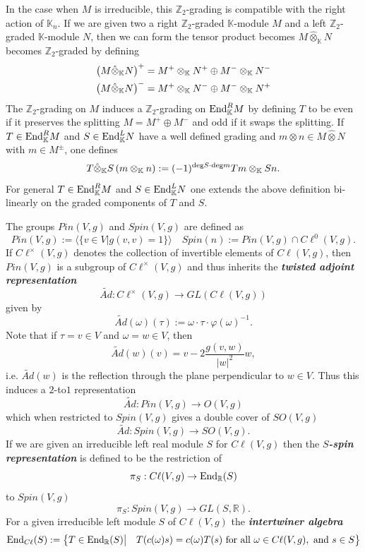 \documentclass[openany, 11pt]{article}
\theoremstyle{definition}
\theoremstyle{remark}
\def\la{\ensuremath{\langle}}
\def\ra{\ensuremath{\rangle}}
\def\lp{\ensuremath{\left(}}
\def\rp{\ensuremath{\right)}}
\def\bR{\ensuremath{\mathbb{R}}}
\def\bZ{\ensuremath{\mathbb{Z}}}
\def\bK{\ensuremath{\mathbb{K}}}
\def\End{\ensuremath{\textnormal{End}}}
\begin{document}
In the case when $M$ is irreducible, this $\bZ_2$-grading is compatible with the right action of $\bK_n$. If we are given two a right $\bZ_2$-graded $\bK$-module $M$ and a left $\bZ_2$-graded $\bK$-module $N$, then we can form the tensor product becomes $M\hat{\otimes}_{\bK}N$ becomes $\bZ_2$-graded by defining
\begin{align*}
    \lp M\hat{\otimes}_{\bK}N\rp^+&=M^+\otimes_{\bK}N^+\oplus M^-\otimes_{\bK}N^-\\
    \lp M\hat{\otimes}_{\bK}N\rp^-&=M^+\otimes_{\bK}N^-\oplus M^-\otimes_{\bK}N^+
\end{align*}
The $\bZ_2$-grading on $M$ induces a $\bZ_2$-grading on $\End^R_{\bK}M$ by defining $T$ to be even if it preserves the splitting $M=M^+\oplus M^-$ and odd if it swaps the splitting. 
If $T\in\End^R_{\bK}M$ and $S\in\End^L_{\bK}N$ have a well defined grading and $m\otimes n\in M\hat{\otimes}N$ with $m\in M^{\pm}$, one defines
\[
    T\hat{\otimes}_{\bK}S\lp m\otimes_{\bK} n\rp:=(-1)^{\text{deg}S\cdot\text{deg}m}Tm\otimes_{\bK} Sn.
\]
For general $T\in\End^R_{\bK}M$ and $S\in\End^L_{\bK}N$ one extends the above definition bi-linearly on the graded components of $T$ and $S$.
\par
The groups $Pin(V,g)$ and $Spin(V,g)$ are defined as
\[
    Pin(V,g):=\la \bigl\{ v\in V\big|g(v,v)=1\bigr\}\ra\quad Spin(n):=Pin(V,g)\cap C\ell^0(V,g).
\]
If $C\ell^{\times}(V,g)$ denotes the collection of invertible elements of $C\ell(V,g)$, then $Pin(V,g)$ is a subgroup of $C\ell^{\times}(V,g)$ and thus inherits the \textbf{\emph{twisted adjoint representation}}
\[
    \widetilde{Ad}:C\ell^{\times}(V,g)\rightarrow GL(C\ell(V,g))
\]
given by
\[
    \widetilde{Ad}(\omega)(\tau):=\omega\cdot\tau\cdot\varphi(\omega)^{-1}.
\]
Note that if $\tau=v\in V$ and $\omega=w\in V$, then 
\[
    \widetilde{Ad}(w)(v)=v-2\frac{g(v,w)}{|w|^2}w,
\]
i.e. $\widetilde{Ad}(w)$ is the reflection through the plane perpendicular to $w\in V$. Thus this induces a $2$-to$1$ representation
\[
    \widetilde{Ad}:Pin(V,g)\rightarrow O(V,g)
\]
which when restricted to $Spin(V,g)$ gives a double cover of $SO(V,g)$
\[
    \widetilde{Ad}:Spin(V,g)\rightarrow SO(V,g).
\]
If we are given an irreducible left real module $S$ for $C\ell(V,g)$ then the \textbf{\emph{$S$-spin representation}} is defined to be the restriction of
\[
    \pi_S:C\ell(V,g)\rightarrow \End_{\bR}(S)
\]
to $Spin(V,g)$
\[
    \pi_S:Spin(V,g)\rightarrow GL(S,\bR).
\]
For a given irreducible left module $S$ of $C\ell(V,g)$ the \textbf{\emph{intertwiner algebra}}
\[
    \End_{C\ell}(S):=\bigl\{T\in\End_{\bR}(S)\big|\quad T(c(\omega)s)=c(\omega)T(s)\text{ for all }\omega\in C\ell(V,g),\text{ and }s\in S\bigr\}
\]
\end{document}
